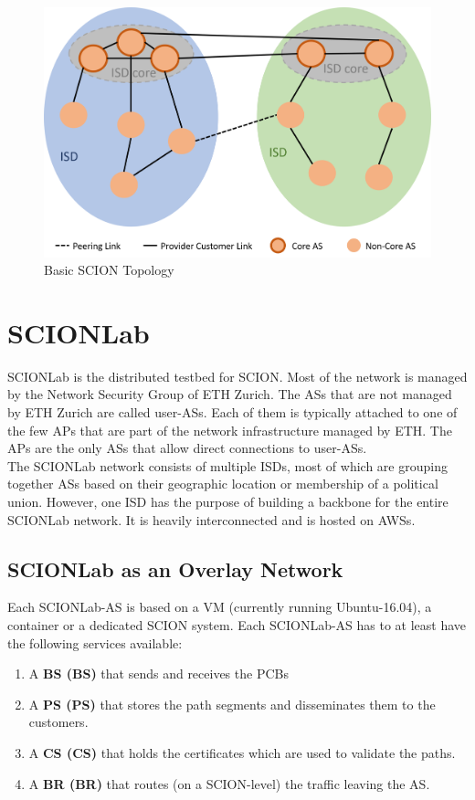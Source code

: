 \begin{figure}[h]
	\centering
	\includegraphics[width =\textwidth]{img/SCION-Topology.png}
	\caption{Basic SCION Topology}
	\label{Basic SCION Topology}
\end{figure}

\section{SCIONLab}
\acs{SCIONLab} is the distributed testbed for \acs{SCION}. Most of the network is managed by the Network Security Group of \acs{ETH} Zurich. The \acsp{AS} that are not managed by \acs{ETH} Zurich are called user-\acsp{AS}. Each of them is typically attached to one of the few \aclp{AP} that are part of the network infrastructure managed by \acs{ETH}. The \acsp{AP} are the only \acsp{AS} that allow direct connections to user-\acsp{AS}.
\\
The \acs{SCIONLab} network consists of multiple \acsp{ISD}, most of which are grouping together \acsp{AS} based on their geographic location or membership of a political union. However, one \acs{ISD} has the purpose of building a backbone for the entire \acs{SCIONLab} network. It is heavily interconnected and is hosted on \aclp{AWS}.

\subsection{SCIONLab as an Overlay Network}

Each \acs{SCIONLab}-\acs{AS} is based on a  \acs{VM} (currently running Ubuntu-16.04), a container or a dedicated \acs{SCION} system. Each \acs{SCIONLab}-\acs{AS} has to at least have the following services available: 
\\
\begin{enumerate}
\item A \textbf{\acl{BS} (\acs{BS})} that sends and receives the \acsp{PCB}
\item A \textbf{\acl{PS} (\acs{PS})} that stores the path segments and disseminates them to the customers.
\item A \textbf{\acl{CS} (\acs{CS})} that holds the certificates which are used to validate the paths.
\item A \textbf{\acl{BR} (\acs{BR})} that routes (on a \acs{SCION}-level) the traffic leaving the \acs{AS}.
\end{enumerate}


